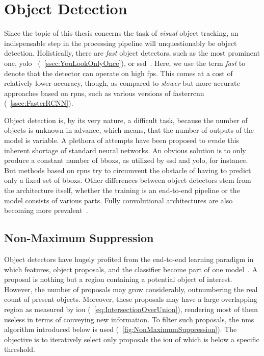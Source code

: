 \section{Object Detection}
\label{sec:ObjectDetection}

Since the topic of this thesis concerns the task of \emph{visual} object tracking, an indispensable step in the processing pipeline will unquestionably be object detection. Holistically, there are \emph{fast} object detectors, such as the most prominent one, \gls{yolo}~\cite{redmon2016yolo} (\sectiontext{}~\ref{ssec:YouLookOnlyOnce}), or \gls{ssd}~\cite{liu2016ssd}. Here, we use the term \emph{fast} to denote that the detector can operate on high \gls{fps}. This comes at a cost of relatively lower accuracy, though, as compared to \emph{slower} but more accurate approaches based on \glspl{rpn}, such as various versions of \gls{fasterrcnn} (\sectiontext{}~\ref{ssec:FasterRCNN}).

Object detection is, by its very nature, a difficult task, because the number of objects is unknown in advance, which means, that the number of outputs of the model is variable. A plethora of attempts have been proposed to evade this inherent shortage of standard neural networks. An obvious solution is to only produce a constant number of \glspl{bbox}, as utilized by \gls{ssd} and \gls{yolo}, for instance. But methods based on \glspl{rpn} try to circumvent the obstacle of having to predict only a fixed set of \glspl{bbox}. Other differences between object detectors stem from the architecture itself, whether the training is an end-to-end pipeline or the model consists of various parts. Fully convolutional architectures are also becoming more prevalent~\cite{tian2019fcos}.

\subsection{Non-Maximum Suppression}
\label{ssec:NonMaximumSuppression}

Object detectors have hugely profited from the end-to-end learning paradigm in which features, object proposals, and the classifier become part of one model~\cite{hosang2017learningnms}. A proposal is nothing but a region containing a potential object of interest. However, the number of proposals may grow considerably, outnumbering the real count of present objects. Moreover, these proposals may have a large overlapping region as measured by \gls{iou} (\sectiontext{}~\ref{eq:IntersectionOverUnion}), rendering most of them useless in terms of conveying new information. To filter such proposals, the \gls{nms} algorithm introduced below is used (\figtext{}~\ref{fig:NonMaximumSuppression}). The objective is to iteratively select only proposals the \gls{iou} of which is below a specific threshold.

